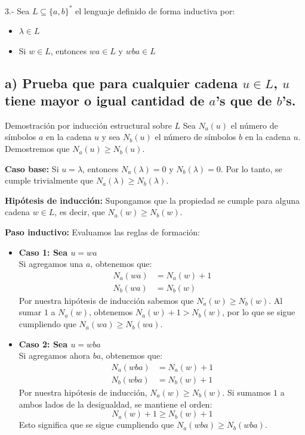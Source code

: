 3.- Sea $L \subseteq \{a, b\}^*$ el lenguaje definido de forma inductiva por:
\begin{itemize}
    \item $\lambda \in L$
    \item Si $w \in L$, entonces $wa \in L$ y $wba \in L$
\end{itemize}

\subsection*{a) Prueba que para cualquier cadena $u \in L$, $u$ tiene mayor o igual cantidad de $a$'s que de $b$'s.}

Demostración por inducción estructural sobre $L$
Sea $N_a(u)$ el número de símbolos $a$ en la cadena $u$ y sea $N_b(u)$ el número de símbolos $b$ en la cadena $u$. Demostremos que $N_a(u) \ge N_b(u)$.

\textbf{Caso base:} Si $u = \lambda$, entonces $N_a(\lambda) = 0$ y $N_b(\lambda) = 0$. Por lo tanto, se cumple trivialmente que $N_a(\lambda) \ge N_b(\lambda)$.

\textbf{Hipótesis de inducción:} Supongamos que la propiedad se cumple para alguna cadena $w \in L$, es decir, que $N_a(w) \ge N_b(w)$.

\textbf{Paso inductivo:} Evaluamos las reglas de formación:
\begin{itemize}
    \item \textbf{Caso 1: Sea $u = wa$} \\
    Si agregamos una $a$, obtenemos que:
    \begin{align*}
        N_a(wa) &= N_a(w) + 1 \\
        N_b(wa) &= N_b(w)
    \end{align*}
    Por nuestra hipótesis de inducción sabemos que $N_a(w) \ge N_b(w)$. Al sumar $1$ a $N_a(w)$, obtenemos $N_a(w) + 1 > N_b(w)$, por lo que se sigue cumpliendo que $N_a(wa) \ge N_b(wa)$.

    \item \textbf{Caso 2: Sea $u = wba$} \\
    Si agregamos ahora $ba$, obtenemos que:
    \begin{align*}
        N_a(wba) &= N_a(w) + 1 \\
        N_b(wba) &= N_b(w) + 1
    \end{align*}
    Por nuestra hipótesis de inducción, $N_a(w) \ge N_b(w)$. Si sumamos $1$ a ambos lados de la desigualdad, se mantiene el orden:
    \[ N_a(w) + 1 \ge N_b(w) + 1 \]
    Esto significa que se sigue cumpliendo que $N_a(wba) \ge N_b(wba)$.
\end{itemize}

